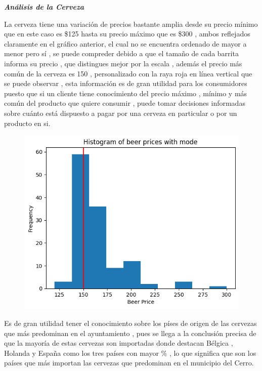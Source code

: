 \documentclass[10pt]{beamer}
\begin{document}
   	
   	\begin{frame}{\textbf{\textit{Análisis de la Cerveza}}}
   		
   	   La cerveza tiene una variación de precios bastante amplia desde su precio mínimo que en este caso es \$125 hasta su precio máximo que es \$300 , ambos reflejados claramente en el gráfico anterior, el cual no se encuentra ordenado de mayor a menor pero sí , se puede compreder debido a que el tamaño de cada barrita informa su precio , que distingues mejor por la escala , además el precio más común de la cerveza es 150 , personalizado con la raya roja en línea vertical que se puede observar , esta información es de gran utilidad para los consumidores puesto que si un cliente tiene conocimiento del precio máximo , mínimo y más común del producto que quiere consumir , puede tomar decisiones informadas sobre cuánto está dispuesto a pagar por una cerveza en particular o por un producto en si.
   	   
   	\end{frame}
   	
   	\begin{frame}
   		
   	\begin{figure}
   		\centering
   		\includegraphics[width=0.7\linewidth]{FIGURA/gráfico precios cerveza}
   		\caption{}
   		\label{fig:grafico-precios-cerveza}
   	\end{figure}
   	
   	\end{frame}
   	
    
    \begin{frame}
    	
     Es de gran utilidad tener el conocimiento sobre los píses de origen de las cervezas que más predominan en el ayuntamiento , pues se llega a la conclusión precisa de que la mayoría de estas cervezas son importadas donde destacan Bélgica , Holanda y España como los tres países con mayor \% , lo que significa que son los países que más importan las cervezas que predominan en el municipio del Cerro.
    	
    \end{frame}
   	
\end{document}
